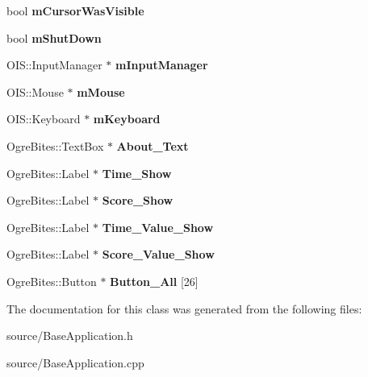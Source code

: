 \begin{DoxyCompactItemize}
\item 
\hypertarget{class_base_application_ac7e861799862cb645f1d78b170aef80d}{bool {\bfseries m\-Cursor\-Was\-Visible}}\label{class_base_application_ac7e861799862cb645f1d78b170aef80d}

\item 
\hypertarget{class_base_application_a755f26d3a9915aaf830750d877e39d86}{bool {\bfseries m\-Shut\-Down}}\label{class_base_application_a755f26d3a9915aaf830750d877e39d86}

\item 
\hypertarget{class_base_application_abc9503c8462e225b5d0d55c952d9e4a9}{O\-I\-S\-::\-Input\-Manager $\ast$ {\bfseries m\-Input\-Manager}}\label{class_base_application_abc9503c8462e225b5d0d55c952d9e4a9}

\item 
\hypertarget{class_base_application_add9b97fbe64da2814d3af113bac58c43}{O\-I\-S\-::\-Mouse $\ast$ {\bfseries m\-Mouse}}\label{class_base_application_add9b97fbe64da2814d3af113bac58c43}

\item 
\hypertarget{class_base_application_a9d6e19cf50c47379fbaae55bff28079c}{O\-I\-S\-::\-Keyboard $\ast$ {\bfseries m\-Keyboard}}\label{class_base_application_a9d6e19cf50c47379fbaae55bff28079c}

\item 
\hypertarget{class_base_application_a163e5a26419ca3462d4d9aac200bd1d1}{Ogre\-Bites\-::\-Text\-Box $\ast$ {\bfseries About\-\_\-\-Text}}\label{class_base_application_a163e5a26419ca3462d4d9aac200bd1d1}

\item 
\hypertarget{class_base_application_a0ce91b17321fff8315a1c558c09316fd}{Ogre\-Bites\-::\-Label $\ast$ {\bfseries Time\-\_\-\-Show}}\label{class_base_application_a0ce91b17321fff8315a1c558c09316fd}

\item 
\hypertarget{class_base_application_a7a54628f50fbf2ffe5d983300ff9a16c}{Ogre\-Bites\-::\-Label $\ast$ {\bfseries Score\-\_\-\-Show}}\label{class_base_application_a7a54628f50fbf2ffe5d983300ff9a16c}

\item 
\hypertarget{class_base_application_a62e99e983e29fe03f77b9efff43956a1}{Ogre\-Bites\-::\-Label $\ast$ {\bfseries Time\-\_\-\-Value\-\_\-\-Show}}\label{class_base_application_a62e99e983e29fe03f77b9efff43956a1}

\item 
\hypertarget{class_base_application_a423c512b139f362e8bc1d14a72b0057d}{Ogre\-Bites\-::\-Label $\ast$ {\bfseries Score\-\_\-\-Value\-\_\-\-Show}}\label{class_base_application_a423c512b139f362e8bc1d14a72b0057d}

\item 
\hypertarget{class_base_application_acb006d144c3704c900fbaab926513be2}{Ogre\-Bites\-::\-Button $\ast$ {\bfseries Button\-\_\-\-All} \mbox{[}26\mbox{]}}\label{class_base_application_acb006d144c3704c900fbaab926513be2}

\end{DoxyCompactItemize}


The documentation for this class was generated from the following files\-:\begin{DoxyCompactItemize}
\item 
source/Base\-Application.\-h\item 
source/Base\-Application.\-cpp\end{DoxyCompactItemize}
